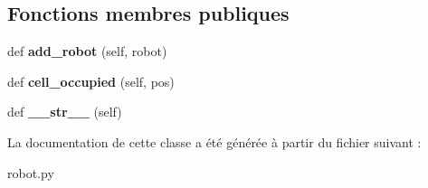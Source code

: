 \subsection*{Fonctions membres publiques}
\begin{DoxyCompactItemize}
\item 
\mbox{\label{classrobot_1_1Robot__group_aed143932a9520e3c8255b76933d7eb41}} 
def {\bfseries add\+\_\+robot} (self, robot)
\item 
\mbox{\label{classrobot_1_1Robot__group_adbbbe6a28fbf51a4bfbb75ad83a85d33}} 
def {\bfseries cell\+\_\+occupied} (self, pos)
\item 
\mbox{\label{classrobot_1_1Robot__group_abd35bb6cd4e236c25155231b8a56953a}} 
def {\bfseries \+\_\+\+\_\+str\+\_\+\+\_\+} (self)
\end{DoxyCompactItemize}


La documentation de cette classe a été générée à partir du fichier suivant \+:\begin{DoxyCompactItemize}
\item 
robot.\+py\end{DoxyCompactItemize}
